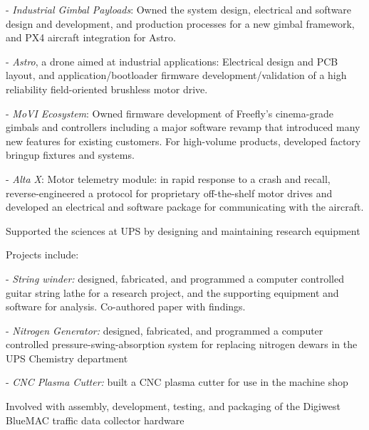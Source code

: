 \documentclass[letterpaper]{deedy-resume} %
\begin{document}
\begin{minipage}[t]{0.66\textwidth}
\begin{tightitemize}
- \textit{Industrial Gimbal Payloads}: Owned the system design, electrical and software design and development, and production processes for a new gimbal framework, and PX4 aircraft integration for Astro.

- \textit{Astro}, a drone aimed at industrial applications: Electrical design and PCB layout, and application/bootloader firmware development/validation of a high reliability field-oriented brushless motor drive. 

- \textit{MoVI Ecosystem}: Owned firmware development of Freefly's cinema-grade gimbals and controllers including a major software revamp that introduced many new features for existing customers.  For high-volume products, developed factory bringup fixtures and systems.

- \textit{Alta X}:  Motor telemetry module: in rapid response to a crash and recall, reverse-engineered a protocol for proprietary off-the-shelf motor drives and developed an electrical and software package for communicating with the aircraft.

\end{tightitemize}

\begin{tightitemize}
\item Supported the sciences at UPS by designing and maintaining research equipment
\item Projects include:

- \textit{String winder:} designed, fabricated, and programmed a computer controlled guitar string lathe for a research project, and the supporting equipment and software for analysis.  Co-authored paper with findings.

- \textit{Nitrogen Generator:} designed, fabricated, and programmed a computer controlled pressure-swing-absorption system for replacing nitrogen dewars in the UPS Chemistry department

- \textit{CNC Plasma Cutter:} built a CNC plasma cutter for use in the machine shop
\end{tightitemize}



\begin{tightitemize}
\item Involved with assembly, development, testing, and packaging of the Digiwest BlueMAC traffic data collector hardware


\end{tightitemize}
\end{minipage}
\end{document}
